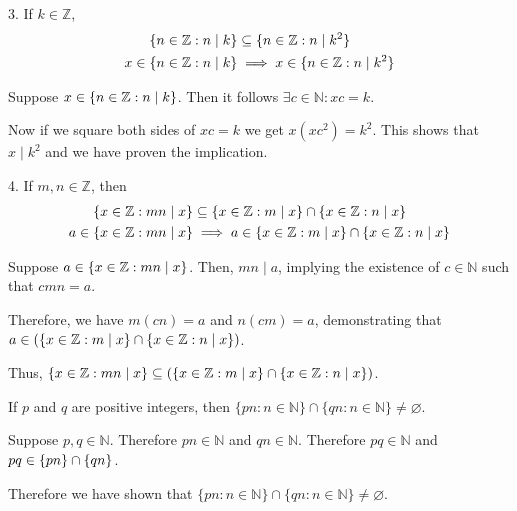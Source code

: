 \documentclass[openany, 12pt]{book}
\begin{document}
\begin{exercise}{}{}{3. If $k \in \mathbb{Z}$,}
	\begin{align*}
		\{n \in \mathbb{Z}: n \mid k\}       & \subseteq \{n \in \mathbb{Z}: n \mid k^2\}      \\
		x \in \{n \in \mathbb{Z}: n \mid k\} & \implies x \in \{n \in \mathbb{Z}: n \mid k^2\}
	\end{align*}
	\begin{alist}
		\item Suppose $x \in \{n \in \mathbb{Z}: n \mid k\}$. Then it follows $\exists
			c\in\mathbb{N}: xc=k$.
		\item Now if we square both sides of
		$xc=k$ we get $x(xc^2) = k^2$.  This shows that $x\mid k^2$ and we have proven
		the implication.
	\end{alist}
\end{exercise}

\begin{exercise}{}{}{4. If $m, n \in \mathbb{Z}$, then}
	\begin{align*}
		\{x \in \mathbb{Z}: mn \mid x\}       & \subseteq \{x \in \mathbb{Z}: m \mid x\} \cap \{x \in \mathbb{Z}: n \mid x\}      \\
		a \in \{x \in \mathbb{Z}: mn \mid x\} & \implies a \in \{x \in \mathbb{Z}: m \mid x\} \cap \{x \in \mathbb{Z}: n \mid x\}
	\end{align*}
	\begin{alist}
		\item Suppose $a \in \{x \in \mathbb{Z}: mn \mid x\}$. Then, $mn \mid
			a$, implying the existence of $c \in \mathbb{N}$ such that $cmn =
			a$.
		\item Therefore, we have $m(cn) = a$ and $n(cm) = a$, demonstrating that
		$a \in \left(\{x \in \mathbb{Z}: m \mid x\} \cap \{x \in
				\mathbb{Z}: n \mid x\}\right)$.
		\item Thus, $\{x \in \mathbb{Z}: mn \mid x\} \subseteq \left(\{x
				\in \mathbb{Z}: m \mid x\} \cap \{x \in \mathbb{Z}: n \mid
				x\}\right)$.
	\end{alist}
\end{exercise}

\begin{exercise}{}{}
	If $p$ and $q$ are positive integers, then $\{p n: n \in
		\mathbb{N}\} \cap\{q n: n \in \mathbb{N}\} \neq \varnothing$.
	\begin{alist}
		\item Suppose $p, q \in \mathbb{N}$. Therefore $pn \in \mathbb{N}$ and
		$qn \in \mathbb{N}$. Therefore $pq \in \mathbb{N}$ and $pq \in \{pn\} \cap
			\{qn\}$.
		\item Therefore we have shown that
		$\{p n: n \in \mathbb{N}\} \cap\{q n: n \in \mathbb{N}\} \neq \varnothing$.
	\end{alist}
\end{exercise}
\end{document}

